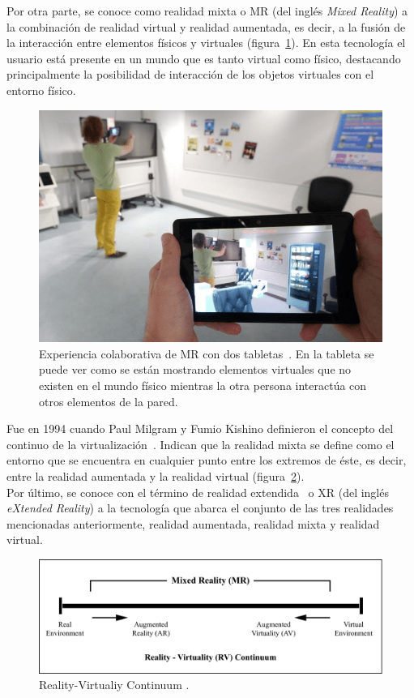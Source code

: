 

Por otra parte, se conoce como realidad mixta o MR (del inglés \textit{Mixed Reality}) a la combinación de realidad virtual y realidad aumentada, es decir, a la fusión de la interacción entre elementos físicos y virtuales (figura~\ref{fig:mrdefinitionexample}). En esta tecnología el usuario está presente en un mundo que es tanto virtual como físico, destacando principalmente la posibilidad de interacción de los objetos virtuales con el entorno físico.\\

\begin{figure}[H]
    \centering
    \includegraphics[scale=0.3]{Images/Estado del arte/mrexampledefinition.png}
    \caption{Experiencia colaborativa de MR con dos tabletas~\cite{mrExampleDefinition}. En la tableta se puede ver como se están mostrando elementos virtuales que no existen en el mundo físico mientras la otra persona interactúa con otros elementos de la pared.}
    \label{fig:mrdefinitionexample}
\end{figure}

Fue en 1994 cuando Paul Milgram y Fumio Kishino definieron el concepto del continuo de la virtualización~\cite{ARDisplayofContinuum}. Indican que la realidad mixta se define como el entorno que se encuentra en cualquier punto entre los extremos de éste, es decir, entre la realidad aumentada y la realidad virtual (figura~\ref{fig:rvcontinuumfig}).\\


Por último, se conoce con el término de realidad extendida~\cite{xrintro} o XR (del inglés \textit{eXtended Reality}) a la tecnología que abarca el conjunto de las tres realidades mencionadas anteriormente, realidad aumentada, realidad mixta y realidad virtual.  

\begin{figure}[htbp]
\centering
    \includegraphics[scale=0.7]{Images/Estado del arte/rvcontinuum.pdf}
    \caption{Reality-Virtualiy Continuum \cite{ARDisplayofContinuum}.}
    \label{fig:rvcontinuumfig}
\end{figure}






